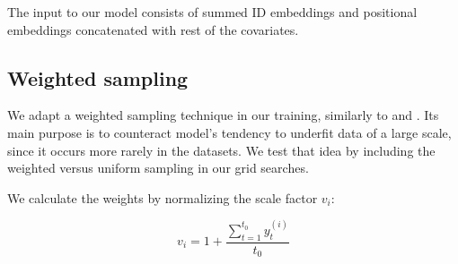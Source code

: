 \documentclass[en]{pracamgr}
\newtheorem{defi}{Definition}[section]
\begin{document}
The input to our model consists of summed ID embeddings and positional embeddings concatenated with rest of the covariates.


\subsection{Weighted sampling}

We adapt a weighted sampling technique in our training, similarly to \cite{enhancing} and \cite{deepar}. Its main purpose is to counteract model's tendency to underfit data of a large scale, since it occurs more rarely in the datasets. We test that idea by including the weighted versus uniform sampling in our grid searches.

We calculate the weights by normalizing the scale factor $v_i$:

$$ v_i = 1 + \frac{\sum^{t_0}_{t=1} y^{(i)}_t}{t_0} $$



%



\end{document}
